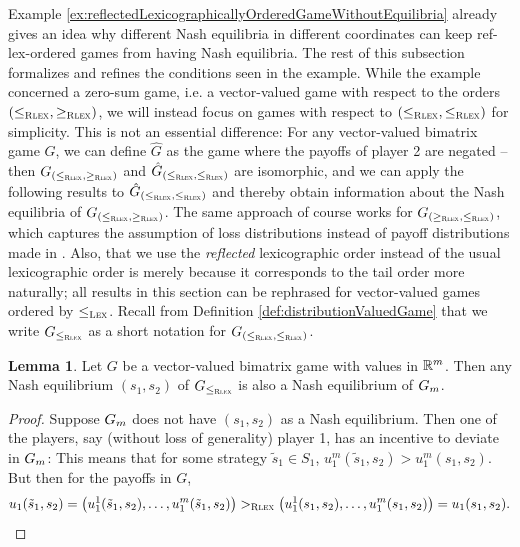 \documentclass[a4paper,DIV=11]{scrreprt}
\theoremstyle{definition}
\newtheorem{lemma}[thm]{Lemma} %
\begin{document}
    Example \ref{ex:reflectedLexicographicallyOrderedGameWithoutEquilibria} already gives an idea why different Nash equilibria in different coordinates can keep ref-lex-ordered games from having Nash equilibria. The rest of this subsection formalizes and refines the conditions seen in the example.
    While the example concerned a zero-sum game, i.e. a vector-valued game with respect to the orders ${(\leq_{\textsc{Rlex}},\geq_{\textsc{Rlex}})}$, we will instead focus on games with respect to ${(\leq_{\textsc{Rlex}},\leq_{\textsc{Rlex}})}$ for simplicity. This is not an essential difference: 
    For any vector-valued bimatrix game $G$, we can define $\hat{G}$ as the game where the payoffs of player 2 are negated -- then $G_{{(\leq_{\textsc{Rlex}},\geq_{\textsc{Rlex}})}}$ and $\hat{G}_{{(\leq_{\textsc{Rlex}},\leq_{\textsc{Rlex}})}}$ are isomorphic, and we can apply the following results to $\hat{G}_{{(\leq_{\textsc{Rlex}},\leq_{\textsc{Rlex}})}}$ and thereby obtain information about the Nash equilibria of $G_{{(\leq_{\textsc{Rlex}},\geq_{\textsc{Rlex}})}}$.
    The same approach of course works for $G_{{(\geq_{\textsc{Rlex}},\leq_{\textsc{Rlex}})}}$, which captures the assumption of loss distributions instead of payoff distributions made in \cite{bib:rassGameRiskManagI}. 
    Also, that we use the \emph{reflected} lexicographic order instead of the usual lexicographic order is merely because it corresponds to the tail order more naturally; all results in this section can be rephrased for vector-valued games ordered by $\leq_{\textsc{Lex}}$.
    Recall from Definition \ref{def:distributionValuedGame} that we write $G_{\leq_{\textsc{Rlex}}}$ as a short notation for $G_{(\leq_{\textsc{Rlex}}, \leq_{\textsc{Rlex}})}$.
    
    \begin{lemma}
        \label{lem:GmHasAllNashEquilibriaOfG}
        Let $G$ be a vector-valued bimatrix game with values in $\mathbb{R}^m$.
        Then any Nash equilibrium $(s_1, s_2)$ of $G_{\leq_{\textsc{Rlex}}}$ is also a Nash equilibrium of $G_{m}$.
    \end{lemma}
    \begin{proof}
        Suppose $G_{m}$ does not have $(s_1, s_2)$ as a Nash equilibrium.
        Then one of the players, say (without loss of generality) player 1, has an incentive to deviate in $G_{m}$:
        This means that for some strategy $\tilde{s}_1 \in S_1$, $u_1^{m}(\tilde{s}_1, s_2) > u_1^{m}(s_1, s_2)$.
        But then for the payoffs in $G$, 
        \begin{gather*}
            u_1(\tilde{s}_1, s_2) = \bigl(u_1^{1}(\tilde{s}_1, s_2), \dots, u_1^{m}(\tilde{s}_1, s_2)\bigr)
            >_{\textsc{Rlex}} \bigl(u_1^{1}(s_1, s_2), \dots, u_1^{m}(s_1, s_2)\bigr) = u_1(s_1, s_2).
        \end{gather*}
    \end{proof}
\end{document}
